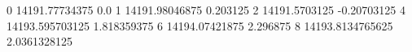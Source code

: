 0 14191.77734375 0.0
1 14191.98046875 0.203125
2 14191.5703125 -0.20703125
4 14193.595703125 1.818359375
6 14194.07421875 2.296875
8 14193.8134765625 2.0361328125
